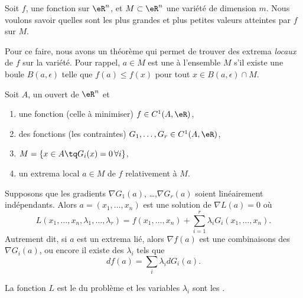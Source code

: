 Soit $f$, une fonction sur $\eR^n$, et $M\subset \eR^n$ une variété de dimension $m$. Nous voulons savoir quelles sont les plus grandes et plus petites valeurs atteintes par $f$ sur $M$.

Pour ce faire, nous avons un théorème qui permet de trouver des extrema \emph{locaux} de $f$ sur la variété. Pour rappel, $a\in M$ est une  à l'ensemble $M$ s'il existe une boule $B(a,\epsilon)$ telle que $f(a)\leq f(x)$ pour tout $x\in B(a,\epsilon)\cap M$.

\begin{theorem} \label{ThoRGJosS}
    Soit \( A\), un ouvert de \( \eR^n\) et
    \begin{enumerate}
        \item
            une fonction (celle à minimiser) $f\in C^1(A,\eR)$,
        \item
            des fonctions (les contraintes) $G_1,\ldots,G_r\in C^1(A,\eR)$,
        \item
            $M=\{ x\in A\tq G_i(x)=0\,\forall i\}$,
        \item
            un extrema local $a\in M$ de $f$ relativement à $M$.
    \end{enumerate}
    Supposons que les gradients $\nabla G_1(a)$, \ldots,$\nabla G_r(a)$ soient linéairement indépendants. Alors $a=(x_1,\ldots,x_n)$ est une solution de \( \nabla L(a)=0\) où
    \begin{equation}
        L(x_1,\ldots,x_n,\lambda_1,\ldots,\lambda_r)=f(x_1,\ldots,x_n)+\sum_{i=1}^r\lambda_iG_i(x_1,\ldots,x_n).
    \end{equation}
    Autrement dit, si \( a\) est un extrema lié, alors \( \nabla f(a)\) est une combinaisons des \( \nabla G_i(a)\), ou encore il existe des \( \lambda_i\) tels que
    \begin{equation}    \label{EqRDsSXyZ}
        df(a)=\sum_i\lambda_idG_i(a).
    \end{equation}
\end{theorem}
La fonction $L$ est le  du problème et les variables \( \lambda_i\) sont les .

